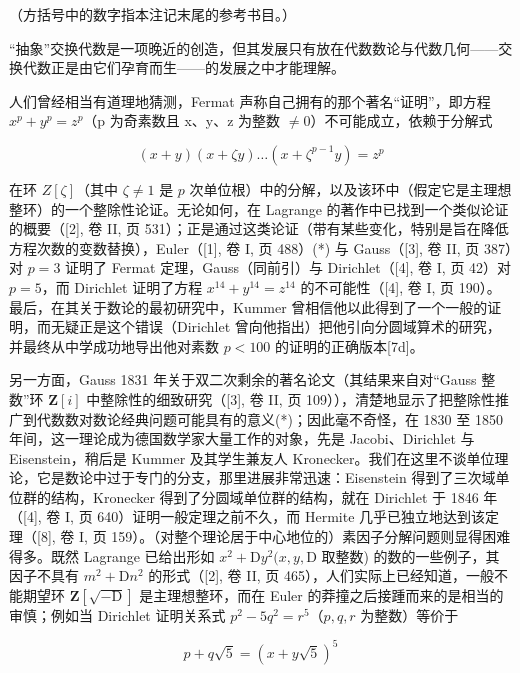
（方括号中的数字指本注记末尾的参考书目。）

“抽象”交换代数是一项晚近的创造，但其发展只有放在代数数论与代数几何——交换代数正是由它们孕育而生——的发展之中才能理解。

人们曾经相当有道理地猜测，Fermat 声称自己拥有的那个著名“证明”，即方程 \(x^{p} + y^{p} = z^{p}\)（p 为奇素数且 x、y、z 为整数 \(\neq 0\)）不可能成立，依赖于分解式

\[
(x + y) (x + \zeta y) \dots (x + \zeta^ {p - 1} y) = z ^ {p}
\]

在环 \(Z[\zeta]\)（其中 \(\zeta \neq 1\) 是 \(p\) 次单位根）中的分解，以及该环中（假定它是主理想整环）的一个整除性论证。无论如何，在 Lagrange 的著作中已找到一个类似论证的概要（{[}2{]}, 卷 II, 页 531）；正是通过这类论证（带有某些变化，特别是旨在降低方程次数的变数替换），Euler（{[}1{]}, 卷 I, 页 488）(*) 与 Gauss（{[}3{]}, 卷 II, 页 387）对 \(p = 3\) 证明了 Fermat 定理，Gauss（同前引）与 Dirichlet（{[}4{]}, 卷 I, 页 42）对 \(p = 5\)，而 Dirichlet 证明了方程 \(x^{14} + y^{14} = z^{14}\) 的不可能性（{[}4{]}, 卷 I, 页 190）。最后，在其关于数论的最初研究中，Kummer 曾相信他以此得到了一个一般的证明，而无疑正是这个错误（Dirichlet 曾向他指出）把他引向分圆域算术的研究，并最终从中学成功地导出他对素数 \(p < 100\) 的证明的正确版本{[}7d{]}。

另一方面，Gauss 1831 年关于双二次剩余的著名论文（其结果来自对“Gauss 整数”环 \(\mathbf{Z}[i]\) 中整除性的细致研究（{[}3{]}, 卷 II, 页 109）），清楚地显示了把整除性推广到代数数对数论经典问题可能具有的意义(*)；因此毫不奇怪，在 1830 至 1850 年间，这一理论成为德国数学家大量工作的对象，先是 Jacobi、Dirichlet 与 Eisenstein，稍后是 Kummer 及其学生兼友人 Kronecker。我们在这里不谈单位理论，它是数论中过于专门的分支，那里进展非常迅速：Eisenstein 得到了三次域单位群的结构，Kronecker 得到了分圆域单位群的结构，就在 Dirichlet 于 1846 年（{[}4{]}, 卷 I, 页 640）证明一般定理之前不久，而 Hermite 几乎已独立地达到该定理（{[}8{]}, 卷 I, 页 159）。（对整个理论居于中心地位的）素因子分解问题则显得困难得多。既然 Lagrange 已给出形如 \(x^{2} + \mathrm{D}y^{2}(x,y,\mathrm{D}\) 取整数) 的数的一些例子，其因子不具有 \(m^2 +\mathrm{D}n^2\) 的形式（{[}2{]}, 卷 II, 页 465），人们实际上已经知道，一般不能期望环 \(\mathbf{Z}[\sqrt{-\mathrm{D}} ]\) 是主理想整环，而在 Euler 的莽撞之后接踵而来的是相当的审慎；例如当 Dirichlet 证明关系式 \(p^2 -5q^2 = r^5\)（\(p,q,r\) 为整数）等价于

\[
p + q \sqrt {5} = (x + y \sqrt {5}) ^ {5}
\]

